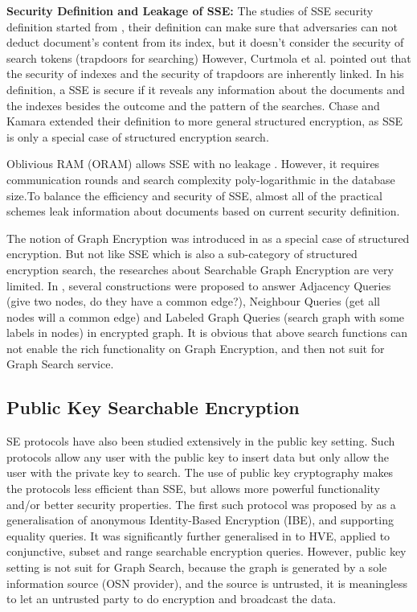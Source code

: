 {\bf Security Definition and Leakage of SSE:} The studies of SSE security definition started from \cite{goh2003secure}, their definition can make sure that adversaries can not deduct document's content from its index, but it doesn't consider the security of search tokens (trapdoors for searching) 
However, Curtmola et al. \cite{curtmola2011searchable} pointed out that the security of indexes and the security of trapdoors are inherently linked. In his definition, a SSE is secure if it reveals any information about the documents and the indexes besides the outcome and the pattern of the searches. 
Chase and Kamara \cite{chase2010structured} extended their definition to more general structured encryption, as SSE is only a special case of structured encryption search.

Oblivious RAM (ORAM) allows SSE with no leakage \cite{goldreich1996software}. However, it requires communication rounds and search complexity poly-logarithmic in the database size.To balance the efficiency and security of SSE, almost all of the practical schemes leak information about documents based on current security definition.

The notion of Graph Encryption was introduced in \cite{chase2010structured} as a special case of structured encryption. But not like SSE which is also a sub-category of structured encryption search, the researches about Searchable Graph Encryption are very limited.
In \cite{chase2010structured}, several constructions were proposed to answer Adjacency Queries (give two nodes, do they have a common edge?), Neighbour Queries (get all nodes will a common edge) and Labeled Graph Queries (search graph with some labels in nodes) in encrypted graph. It is obvious that above search functions can not enable the rich functionality on Graph Encryption, and then not suit for Graph Search service.

\subsection{Public Key Searchable Encryption}
SE protocols have also been studied extensively in the public key setting. Such protocols allow any user with the public key to insert data but only allow the user with the private key to search. The use of public key cryptography makes the protocols less efficient than SSE, but allows more powerful functionality and/or better security properties. 
The first such protocol was proposed by \cite{boneh2004public} as a generalisation of anonymous Identity-Based Encryption (IBE), and supporting equality queries. It was significantly further generalised in \cite{boneh2007conjunctive} to HVE, applied to conjunctive, subset and range searchable encryption queries. 
However, public key setting is not suit for Graph Search, because the graph is generated by a sole information source (OSN provider), and the source is untrusted, it is meaningless to let an untrusted party to do encryption and broadcast the data.

